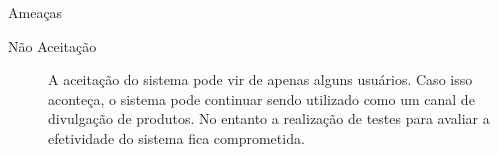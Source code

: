 \documentclass[]{article}
\begin{document}
\begin{description}
  \item Ameaças
  \begin{description}
    \item[Não Aceitação] A aceitação do sistema pode vir de apenas alguns usuários. Caso isso aconteça, o sistema pode continuar sendo utilizado como um canal de divulgação de produtos. No entanto a realização de testes para avaliar a efetividade do sistema fica comprometida.
  \end{description}
\end{description}




%
%
\end{document}
